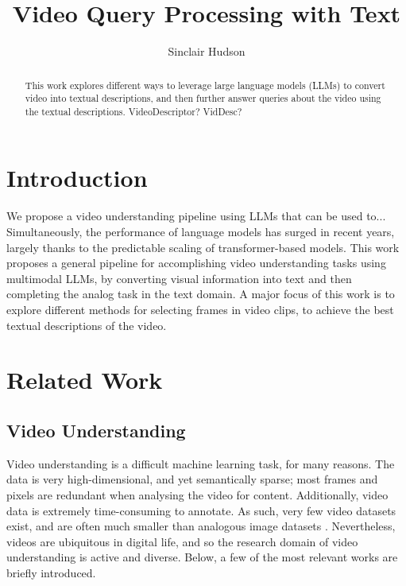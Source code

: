 \documentclass{article}
\title{Video Query Processing with Text}
\author{Sinclair Hudson}
\begin{document}
\maketitle

\begin{abstract}
      This work explores different ways to leverage large language models (LLMs) to convert video into textual descriptions, and then further answer queries about the video using the textual descriptions.
      VideoDescriptor?
      VidDesc?
\end{abstract}

\section{Introduction}

We propose a video understanding pipeline using LLMs that can be used to...
Simultaneously, the performance of language models has surged in recent years, largely thanks to the predictable scaling of transformer-based models.
This work proposes a general pipeline for accomplishing video understanding tasks using multimodal LLMs, by converting visual information into text and then completing the analog task in the text domain.
A major focus of this work is to explore different methods for selecting frames in video clips, to achieve the best textual descriptions of the video.

\section{Related Work}

\subsection{Video Understanding}

Video understanding is a difficult machine learning task, for many reasons.
The data is very high-dimensional, and yet semantically sparse; most frames and pixels are redundant when analysing the video for content.
Additionally, video data is extremely time-consuming to annotate.
As such, very few video datasets exist, and are often much smaller than analogous image datasets \cite{imagenet} \cite{COCO}.
Nevertheless, videos are ubiquitous in digital life, and so the research domain of video understanding is active and diverse.
Below, a few of the most relevant works are briefly introduced.
\end{document}
